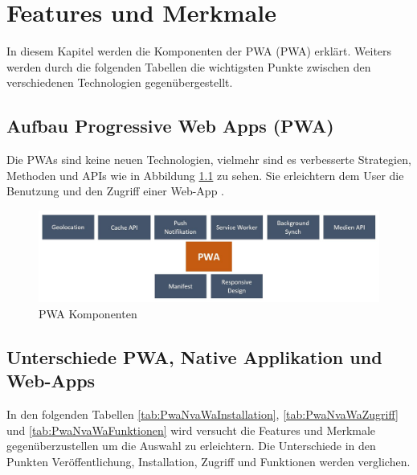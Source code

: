 \chapter{Features und Merkmale}\label{chab:FeaturesundMerkmale}
\thispagestyle{standard}
\pagestyle{standard}
\renewcommand{\footrulewidth}{0.4pt}
In diesem Kapitel werden die Komponenten der \acl{PWA} (\acs{PWA}) erklärt. Weiters werden durch die folgenden Tabellen die wichtigsten Punkte zwischen den verschiedenen Technologien  gegenübergestellt.

\section{Aufbau Progressive Web Apps (PWA)}
Die \acs{PWA}s sind keine neuen Technologien, vielmehr sind es verbesserte Strategien, Methoden und APIs wie in Abbildung \ref{fig:Komponenten} zu sehen. 
Sie erleichtern dem User die Benutzung und den Zugriff einer \acs{Web-App} \cite{AlternativePWA}. 

\begin{figure}[h]
	\centering
	\includegraphics[width=14cm]{BilderAllgemein/PWA_Features}\medskip
	\caption{PWA Komponenten}
	\label{fig:Komponenten}
\end{figure}

\section{Unterschiede PWA, Native Applikation und Web-Apps}\label{chap:UnterschiedePWA,NativeApplikationundWeb-Apps}
In den folgenden Tabellen \ref{tab:PwaNvaWaInstallation}, \ref{tab:PwaNvaWaZugriff} und \ref{tab:PwaNvaWaFunktionen}  wird versucht die Features und Merkmale gegenüberzustellen um die Auswahl zu erleichtern. Die Unterschiede in den Punkten Veröffentlichung, Installation, Zugriff und Funktionen werden verglichen.


